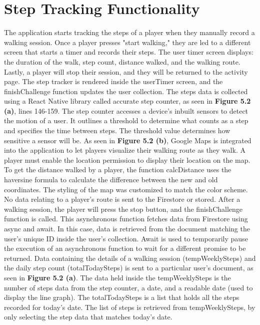 \documentclass{l4proj}
\begin{document}
\section{Step Tracking Functionality}
The application starts tracking the steps of a player when they manually record a walking session. Once a player presses "start walking," they are led to a different screen that starts a timer and records their steps. The user timer screen displays: the duration of the walk, step count, distance walked, and the walking route. Lastly, a player will stop their session, and they will be returned to the activity page. The step tracker is rendered inside the userTimer screen, and the finishChallenge function updates the user collection. 
The steps data is collected using a React Native library called accurate step counter, as seen in \textbf{Figure 5.2 (a)}, lines 146-159. The step counter accesses a device's inbuilt sensors to detect the motion of a user. It outlines a threshold to determine what counts as a step and specifies the time between steps. The threshold value determines how sensitive a sensor will be. 
As seen in \textbf{Figure 5.2 (b)}, Google Maps is integrated into the application to let players visualize their walking route as they walk. A player must enable the location permission to display their location on the map. To get the distance walked by a player, the function calcDistance uses the haversine formula to calculate the difference between the new and old coordinates. The styling of the map was customized to match the color scheme. No data relating to a player's route is sent to the Firestore or stored.  
After a walking session, the player will press the stop button, and the finishChallenge function is called. This asynchronous function fetches data from Firestore using async and await. In this case, data is retrieved from the document matching the user's unique ID inside the user's collection. Await is used to temporarily pause the execution of an asynchronous function to wait for a different promise to be returned. Data containing the details of a walking session (tempWeeklySteps) and the daily step count (totalTodaySteps) is sent to a particular user's document, as seen in \textbf{Figure 5.2 (a)}. The data held inside the tempWeeklySteps is the number of steps data from the step counter, a date, and a readable date (used to display the line graph). The totalTodaySteps is a list that holds all the steps recorded for today's date. The list of steps is retrieved from tempWeeklySteps, by only selecting the step data that matches today's date. 
\end{document}
